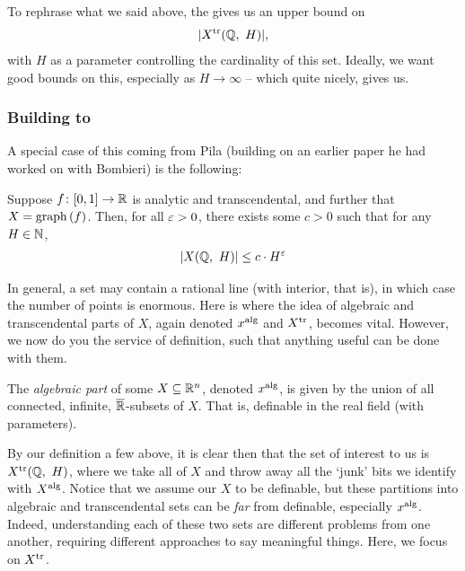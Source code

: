 To rephrase what we said above, the \pwt gives us an upper bound on
  \begin{align*}
    \card{\XtrQH[H]},
  \end{align*}
  with $H$ as a parameter controlling the cardinality of this set. Ideally, we want good bounds on this, especially as $H \to \infty$ -- which quite nicely, \pw gives us.

\subsubsection{Building to \pw}

A special case of this coming from Pila (building on an earlier paper he had worked on with Bombieri) is the following:

\begin{theorem}
  Suppose $\funcdom{f}{[0, 1]}{\R}$ is analytic and transcendental, and further that $X = \graph{f}$. Then, for all $\eps > 0$, there exists some $c > 0$ such that for any $H \in \N$,
    \begin{align*}
      \card{\XQH[H]} \leq c \cdot H^{\eps}
    \end{align*}
\end{theorem}

In general, a  set may contain a rational line (with interior, that is), in which case the number of points is enormous. Here is where the idea of algebraic and transcendental parts of $X$, again denoted $\Xalg[x]$ and $\Xtr[X]$, becomes vital. However, we now do you the service of definition, such that anything useful can be done with them.

\begin{definition}
  The \emph{algebraic part} of some $\XRn[X]{n}$, denoted $\Xalg[x]$, is given by the union of all connected, infinite, $\overline{\R}$- subsets of $X$. That is, definable in the real field (with parameters).
\end{definition}

By our definition a few above, it is clear then that the set of interest to us is $\XtrQH[H]$, where we take all of $X$ and throw away all the `junk' bits we identify with $\Xalg[X]$. Notice that we assume our $X$ to be definable, but these partitions into algebraic and transcendental sets can be \emph{far} from definable, especially $\Xalg[x]$. Indeed, understanding each of these two sets are different problems from one another, requiring different approaches to say meaningful things. Here, we focus on $\Xtr[X]$.

